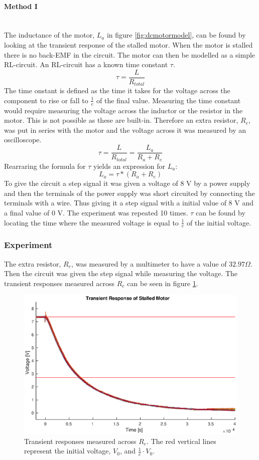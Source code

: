 \paragraph{Method I}~\\
The inductance of the motor, $L_a$ in figure \ref{fig:dcmotormodel}, can be found by looking at the transient response of the stalled motor. 
When the motor is stalled there is no back-EMF in the circuit. The motor can then be modelled as a simple RL-circuit. 
An RL-circuit has a known time constant $\tau$.
$$\tau = \frac{L}{R_{total}}$$
The time onstant is defined as the time it takes for the voltage across the component to rise or fall to $\frac{1}{e}$ of the final value.
Measuring the time constant would require measuring the voltage across the inductor or the resistor in the motor. This is not possible as these are built-in. 
Therefore an extra resistor, $R_e$, was put in series with the motor and the voltage across it was measured by an oscilloscope. 
$$\tau = \frac{L}{R_{total}} = \frac{L_a}{R_a+R_e}$$
Rearraring the formula for $\tau$ yields an expression for $L_a$: 
$$L_a = \tau * (R_a + R_e)$$
To give the circuit a step signal it was given a voltage of 8 V by a power supply and then the terminals of the power supply was  short circuited by connecting the terminals with a wire. Thus giving it a step signal with a initial value of 8 V and a final value of 0 V.
The experiment was repeated 10 times. $\tau$ can be found by locating the time where the measured voltage is equal to $\frac{1}{e}$ of the initial voltage.

\subsubsection{Experiment}
The extra resistor, $R_e$, was measured by a multimeter to have a value of $32.97\Omega$.
Then the circuit was given the step signal while measuring the voltage.
The transient responses measured across $R_e$ can be seen in figure \ref{fig:trans_plot}.

\begin{figure}[!h]
	\centering
	\includegraphics[width=.75\linewidth]{graphics/transient_32ohm}
	\caption{Transient responses measured across $R_e$. The red vertical lines represent the initial voltage, $V_0$, and $\frac{1}{e} \cdot V_0$.}
	\label{fig:trans_plot}
\end{figure}


